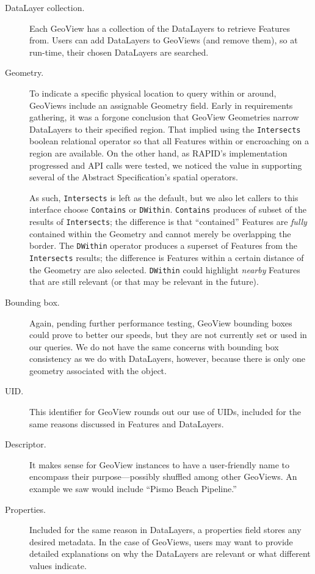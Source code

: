 \begin{description}

\item[DataLayer collection.] 
Each GeoView has a collection of the DataLayers to retrieve Features from. Users can add DataLayers to GeoViews (and remove them), so at run-time, their chosen DataLayers are searched.

\item[Geometry.] 
To indicate a specific physical location to query within or around, GeoViews include an assignable Geometry field. Early in requirements gathering, it was a forgone conclusion that GeoView Geometries narrow DataLayers to their specified region. That implied using the \texttt{Intersects} boolean relational operator so that all Features within or encroaching on a region are available. On the other hand, as RAPID's implementation progressed and API calls were tested, we noticed the value in supporting several of the Abstract Specification's spatial operators.

As such, \texttt{Intersects} is left as the default, but we also let callers to this interface choose \texttt{Contains} or \texttt{DWithin}. \texttt{Contains} produces of subset of the results of \texttt{Intersects}; the difference is that ``contained'' Features are \textit{fully} contained within the Geometry and cannot merely be overlapping the border. The \texttt{DWithin} operator produces a superset of Features from the \texttt{Intersects} results; the difference is Features within a certain distance of the Geometry are also selected. \texttt{DWithin} could highlight \textit{nearby} Features that are still relevant (or that may be relevant in the future).

\item[Bounding box.] 
Again, pending further performance testing, GeoView bounding boxes could prove to better our speeds, but they are not currently set or used in our queries. We do not have the same concerns with bounding box consistency as we do with DataLayers, however, because there is only one geometry associated with the object.

\item[UID.] 
This identifier for GeoView rounds out our use of UIDs, included for the same reasons discussed in Features and DataLayers.

\item[Descriptor.] 
It makes sense for GeoView instances to have a user-friendly name to encompass their purpose---possibly shuffled among other GeoViews. An example we saw would include ``Pismo Beach Pipeline.''

\item[Properties.] 
Included for the same reason in DataLayers, a properties field stores any desired metadata. In the case of GeoViews, users may want to provide detailed explanations on why the DataLayers are relevant or what different values indicate.

\end{description}

